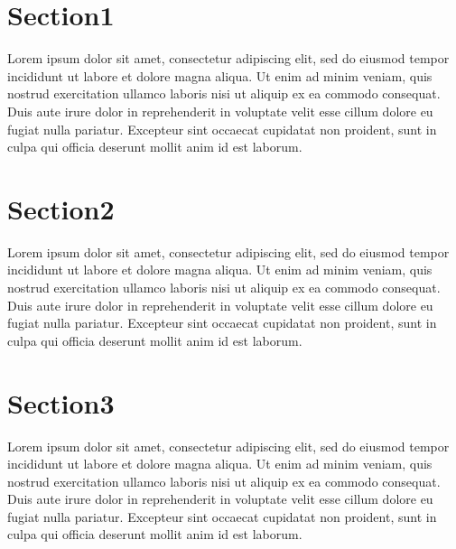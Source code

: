 \documentclass[journal, a4paper]{IEEEtran}
\begin{document}
{
\large 

\noindent\makebox[\linewidth]{\rule{\textwidth}{0.4pt}}


\section{Section1}

\vspace{0.2cm}

Lorem ipsum dolor sit amet, consectetur adipiscing elit, sed do eiusmod tempor incididunt ut labore et dolore magna aliqua. Ut enim ad minim veniam, quis nostrud exercitation ullamco laboris nisi ut aliquip ex ea commodo consequat. Duis aute irure dolor in reprehenderit in voluptate velit esse cillum dolore eu fugiat nulla pariatur. Excepteur sint occaecat cupidatat non proident, sunt in culpa qui officia deserunt mollit anim id est laborum.

\section{Section2}

\vspace{0.2cm}

Lorem ipsum dolor sit amet, consectetur adipiscing elit, sed do eiusmod tempor incididunt ut labore et dolore magna aliqua. Ut enim ad minim veniam, quis nostrud exercitation ullamco laboris nisi ut aliquip ex ea commodo consequat. Duis aute irure dolor in reprehenderit in voluptate velit esse cillum dolore eu fugiat nulla pariatur. Excepteur sint occaecat cupidatat non proident, sunt in culpa qui officia deserunt mollit anim id est laborum.

\section{Section3}

\vspace{0.2cm}

Lorem ipsum dolor sit amet, consectetur adipiscing elit, sed do eiusmod tempor incididunt ut labore et dolore magna aliqua. Ut enim ad minim veniam, quis nostrud exercitation ullamco laboris nisi ut aliquip ex ea commodo consequat. Duis aute irure dolor in reprehenderit in voluptate velit esse cillum dolore eu fugiat nulla pariatur. Excepteur sint occaecat cupidatat non proident, sunt in culpa qui officia deserunt mollit anim id est laborum.


\vfill

}
\end{document}
